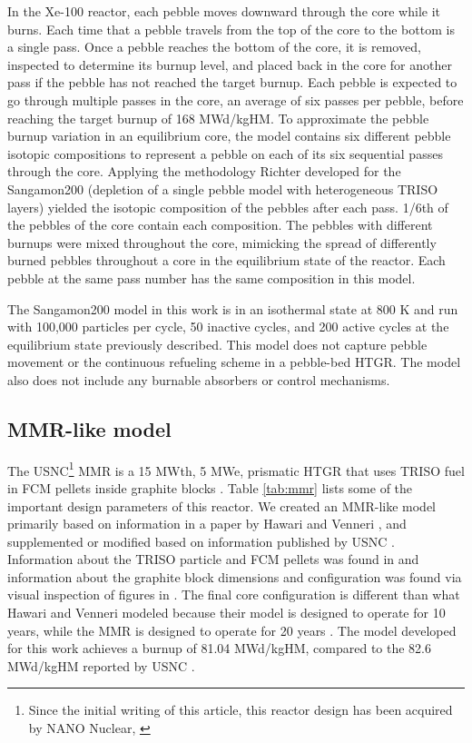 In the Xe-100 reactor, each pebble moves downward through the
core while it burns. Each 
time that a pebble travels from the top of the core to the bottom is a single 
pass. Once a pebble reaches the bottom of the core, it is removed, 
inspected to determine its burnup level, and placed back in 
the core for another pass if the pebble has 
not reached the target burnup. Each pebble is expected to 
go through multiple passes in the core, an average 
of six passes per pebble, before reaching the target burnup of 168 
MWd/kgHM. To approximate the pebble burnup variation in an 
equilibrium core, the model contains
six different pebble isotopic compositions to  
represent a pebble on each of its six sequential passes through 
the core. 
Applying the methodology 
Richter developed for the Sangamon200 
\cite{richter_isotopic_2022} (depletion of a single pebble model 
with heterogeneous \gls*{TRISO} layers) yielded the isotopic 
composition of the pebbles after each pass.
1/6th of the pebbles of the core contain each composition. 
The pebbles with different burnups 
were mixed throughout the core, mimicking the spread of 
differently burned pebbles throughout a core in the equilibrium state 
of the reactor. Each pebble at the same pass number has the same 
composition in this model.   

The Sangamon200 model in this work is in an isothermal state 
at 800 K and run 
with 100,000 particles per cycle, 50 inactive cycles, 
and 200 active cycles at the equilibrium state previously described. 
This model does not capture pebble movement or the continuous 
refueling scheme in a pebble-bed \gls*{HTGR}. The model 
also does not include any burnable absorbers or control 
mechanisms.

\subsection{MMR-like model}
The \gls*{USNC}\footnote{Since the initial writing of 
this article, this reactor design has been acquired by NANO Nuclear, 
\cite{noauthor_nano_2025}} \gls*{MMR} is a 15 MWth, 5 MWe, prismatic \gls*{HTGR} that 
uses \gls*{TRISO} fuel in \gls*{FCM} pellets inside graphite blocks 
\cite{noauthor_usnc_2021}. Table \ref{tab:mmr} lists some of the important 
design parameters of this reactor.
We created an \gls*{MMR}-like model primarily based on information in 
a paper by Hawari and Venneri
\cite{hawari_development_2018}, and supplemented or modified based on 
information published by \gls*{USNC} \cite{noauthor_usnc_2021,venneri_micro_2019}. 
Information about the \gls*{TRISO} 
particle and \gls*{FCM} pellets was found in \cite{noauthor_usnc_2021}
and information about the graphite block dimensions and configuration 
was found via visual inspection of figures in \cite{venneri_micro_2019}. 
The final core configuration 
is different than what Hawari and Venneri modeled \cite{hawari_development_2018} 
because their model is designed to operate 
for 10 years, while the \gls*{MMR} is designed to operate for 20 years 
\cite{noauthor_usnc_2021}. The model developed for this work 
achieves a burnup 
of 81.04 MWd/kgHM, compared to the 82.6 MWd/kgHM reported by 
\gls*{USNC} \cite{noauthor_usnc_2021}.


